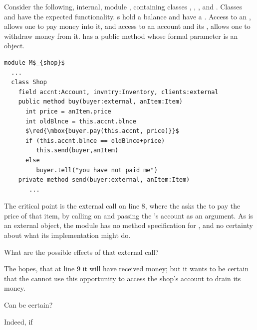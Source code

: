 Consider the following, internal, module \Mshop, %
containing classes , , , and . 
Classes  { and  have the expected functionality. 
s hold a balance and have a \password. 
Access to an ,  allows one  to pay money into it, 
and  access to an account  and its \password, allows one to withdraw money from it.
}
   has  a public method  whose formal parameter  is an    object. 

\begin{lstlisting}[mathescape=true, language=Chainmail, frame=lines]
module M$_{shop}$
  ...   
  class Shop
    field accnt:Account, invntry:Inventory, clients:external      
    public method buy(buyer:external, anItem:Item)
      int price = anItem.price
      int oldBlnce = this.accnt.blnce
      $\red{\mbox{buyer.pay(this.accnt, price)}}$      
      if (this.accnt.blnce == oldBlnce+price)  
         this.send(buyer,anItem)
      else
         buyer.tell("you have not paid me")      
    private method send(buyer:external, anItem:Item)  
       ...         
\end{lstlisting}
 
 

The critical point is the external call on line 8,   {where the  asks the  to pay the price of that item,
by calling   on  and passing the 's account as an argument.
As  is an external object, the module \Mshop has no method specification for , and no 
certainty about what its implementation %
might do. 
}

{What are the possible effects of that external call?}
{The  hopes, %
 that at line 9  it  will have received money; but 
it wants to be certain  that the  cannot use this opportunity to access the 
shop's account to drain its money.

Can   be certain?} Indeed, if

